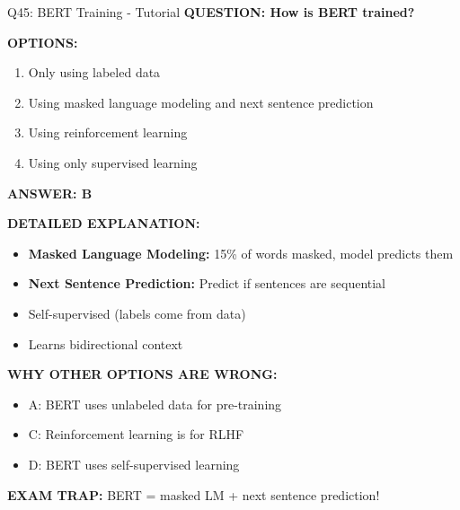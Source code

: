 \documentclass[8pt]{beamer}
\begin{document}
	\begin{frame}{Q45: BERT Training - Tutorial}
		\fontsize{6.5}{7.5}\selectfont
		\textbf{QUESTION: How is BERT trained?}
		
		\vspace{0.1cm}
		\textbf{OPTIONS:}
		\begin{enumerate}
			\item Only using labeled data
			\item Using masked language modeling and next sentence prediction
			\item Using reinforcement learning
			\item Using only supervised learning
		\end{enumerate}
		
		\vspace{0.1cm}
		\textcolor{myblue}{\textbf{ANSWER: B}}
		
		\vspace{0.1cm}
		\textbf{DETAILED EXPLANATION:}
		\begin{itemize}
			\item \textbf{Masked Language Modeling:} 15\% of words masked, model predicts them
			\item \textbf{Next Sentence Prediction:} Predict if sentences are sequential
			\item Self-supervised (labels come from data)
			\item Learns bidirectional context
		\end{itemize}
		
		\vspace{0.1cm}
		\textcolor{myred}{\textbf{WHY OTHER OPTIONS ARE WRONG:}}
		\begin{itemize}
			\item \textcolor{myred}{A:} BERT uses unlabeled data for pre-training
			\item \textcolor{myred}{C:} Reinforcement learning is for RLHF
			\item \textcolor{myred}{D:} BERT uses self-supervised learning
		\end{itemize}
		
		\textcolor{myred}{\textbf{EXAM TRAP:}} BERT = \textcolor{myblue}{masked LM + next sentence prediction}!
	\end{frame}
	
\end{document}
